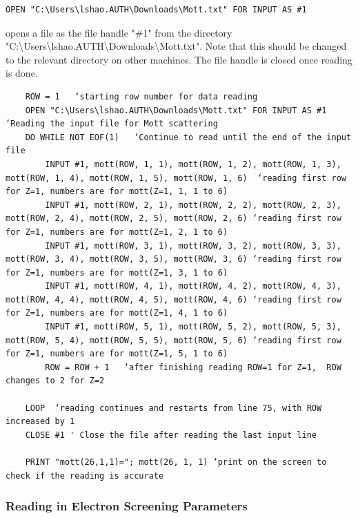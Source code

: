 \documentclass[10pt, reqno]{exam}
\begin{document}
{\vspace{0.5 cm}

\begin{verbatim}
OPEN "C:\Users\lshao.AUTH\Downloads\Mott.txt" FOR INPUT AS #1
\end{verbatim}

opens a file as the file handle "\#1" from the directory "C:\textbackslash Users\textbackslash lshao.AUTH\textbackslash Downloads\textbackslash Mott.txt". Note that this should be changed to the relevant directory on other machines. The file handle is closed once reading is done.


\begin{verbatim}
    ROW = 1   ‘starting row number for data reading
    OPEN "C:\Users\lshao.AUTH\Downloads\Mott.txt" FOR INPUT AS #1 ‘Reading the input file for Mott scattering
    DO WHILE NOT EOF(1)   ‘Continue to read until the end of the input file
        INPUT #1, mott(ROW, 1, 1), mott(ROW, 1, 2), mott(ROW, 1, 3), mott(ROW, 1, 4), mott(ROW, 1, 5), mott(ROW, 1, 6)  ‘reading first row for Z=1, numbers are for mott(Z=1, 1, 1 to 6)
        INPUT #1, mott(ROW, 2, 1), mott(ROW, 2, 2), mott(ROW, 2, 3), mott(ROW, 2, 4), mott(ROW, 2, 5), mott(ROW, 2, 6) ‘reading first row for Z=1, numbers are for mott(Z=1, 2, 1 to 6)
        INPUT #1, mott(ROW, 3, 1), mott(ROW, 3, 2), mott(ROW, 3, 3), mott(ROW, 3, 4), mott(ROW, 3, 5), mott(ROW, 3, 6) ‘reading first row for Z=1, numbers are for mott(Z=1, 3, 1 to 6)
        INPUT #1, mott(ROW, 4, 1), mott(ROW, 4, 2), mott(ROW, 4, 3), mott(ROW, 4, 4), mott(ROW, 4, 5), mott(ROW, 4, 6) ‘reading first row for Z=1, numbers are for mott(Z=1, 4, 1 to 6)
        INPUT #1, mott(ROW, 5, 1), mott(ROW, 5, 2), mott(ROW, 5, 3), mott(ROW, 5, 4), mott(ROW, 5, 5), mott(ROW, 5, 6) ‘reading first row for Z=1, numbers are for mott(Z=1, 5, 1 to 6)
        ROW = ROW + 1   ‘after finishing reading ROW=1 for Z=1,  ROW changes to 2 for Z=2
    
    LOOP  ‘reading continues and restarts from line 75, with ROW increased by 1
    CLOSE #1 ' Close the file after reading the last input line

    PRINT "mott(26,1,1)="; mott(26, 1, 1) ‘print on the screen to check if the reading is accurate
\end{verbatim}
\subsubsection{Reading in Electron Screening Parameters}

}
\end{document}
